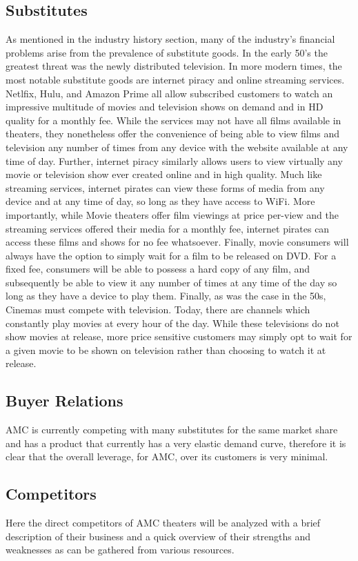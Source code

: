 \documentclass[12pt]{article}
\begin{document}
\subsection{Substitutes}
As mentioned in the industry history section, many of the industry's financial problems arise from the prevalence of substitute goods. In the early 50's the greatest threat was the newly distributed television. In more modern times, the most notable substitute goods are internet piracy and online streaming services. Netlfix, Hulu, and Amazon Prime all allow subscribed customers to watch an impressive multitude of movies and television shows on demand and in HD quality for a monthly fee. While the services may not have all films available in theaters, they nonetheless offer the convenience of being able to view films and television any number of times from any device with the website available at any time of day. Further, internet piracy similarly allows users to view virtually any movie or television show ever created online and in high quality. Much like streaming services, internet pirates can view these forms of media from any device and at any time of day, so long as they have access to WiFi. More importantly, while Movie theaters offer film viewings at price per-view and the streaming services offered their media for a monthly fee, internet pirates can access these films and shows for no fee whatsoever. Finally, movie consumers will always have the option to simply wait for a film to be released on DVD. For a fixed fee, consumers will be able to possess a hard copy of any film, and subsequently be able to view it any number of times at any time of the day so long as they have a device to play them. Finally, as was the case in the 50s, Cinemas must compete with television. Today, there are channels which constantly play movies at every hour of the day. While these televisions do not show movies at release, more price sensitive customers may simply opt to wait for a given movie to be shown on television rather than choosing to watch it at release. 
\subsection{Buyer Relations}
AMC is currently competing with many substitutes for the same market share and has a product that currently has a very elastic demand curve, therefore it is clear that the overall leverage, for AMC, over its customers is very minimal.
\subsection{Competitors}
Here the direct competitors of AMC theaters will be analyzed with a brief description of their business and a quick overview of their strengths and weaknesses as can be gathered from various resources. 
\end{document}
